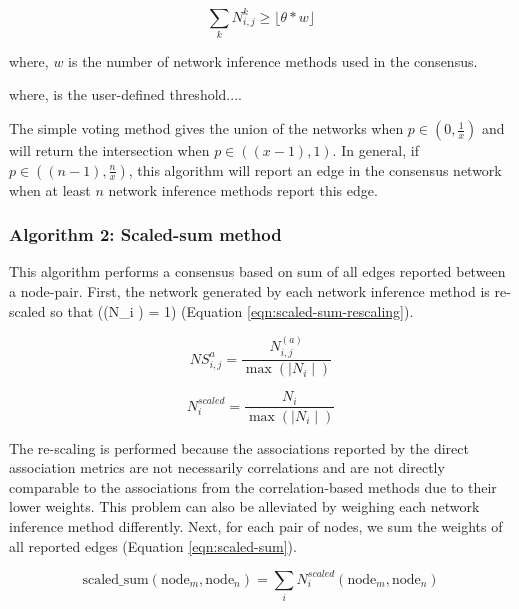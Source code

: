    \begin{equation}
   \sum_k N^k_{i,j} \geq \lfloor \theta * w \rfloor
  \label{eqn:simple-voting2}
  \end{equation}
 
  
  where, \(w\) is the number of network inference methods used in the consensus.


 where, \theta is the user-defined threshold....

  The simple voting method gives the union of the networks when \(p \in (0, \frac{1}{x})\) and will return the intersection when \(p \in ((x - 1), 1)\). In general, if \(p \in ((n - 1), \frac{n}{x})\), this algorithm will report an edge in the consensus network when at least \(n\) network inference methods report this edge.

  \subsubsection*{Algorithm 2: Scaled-sum method}

  This algorithm performs a consensus based on sum of all edges reported between a node-pair. First, the network generated by each network inference method is re-scaled so that (\max(\mid N_{i} \mid) = 1) (Equation \ref{eqn:scaled-sum-rescaling}).


\begin{equation}
  NS^{a}_{i,j} = \frac{N^{(a)}_{i,j}}{\max(\mid N_{i} \mid)}
  \label{eqn:scaled-sum-rescaling}
  \end{equation}
  
  
  \begin{equation}
  N^{scaled}_{i} = \frac{N_{i}}{\max(\mid N_{i} \mid)}
  \label{eqn:scaled-sum-rescaling}
  \end{equation}

  The re-scaling is performed because the associations reported by the direct association metrics are not necessarily correlations and are not directly comparable to the associations from the correlation-based methods due to their lower weights. This problem can also be alleviated by weighing each network inference method differently. Next, for each pair of nodes, we sum the weights of all reported edges (Equation \ref{eqn:scaled-sum}).

  \begin{equation}
  \text{scaled\_sum}(\text{node}_{m}, \text{node}_{n}) = \sum_{i} N^{scaled}_{i}(\text{node}_{m}, \text{node}_{n})
  \label{eqn:scaled-sum}
  \end{equation}

